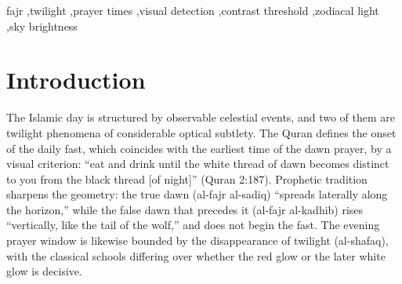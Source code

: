 \documentclass[preprint,12pt]{elsarticle}
\begin{document}
\begin{frontmatter}
\begin{abstract}
42 dates, and even the $15^{\circ}$ convention is undefined on 8. The
calibrated constant inverts consistently ($f = 51$ to 57) across the
central-mean desert campaigns it is calibrated on, with one documented
outlier (Hail, whose observed dawn is far shallower than every other
desert campaign) and no latitude trend: it behaves as a single
property of human dawn detection rather than a fit artifact. We further
compute the false dawn as a distinct earlier detection of the zodiacal
column, reproduce the qualitative suppression of its distinctness by
urban skyglow, and quantify how measured cloud fields, aerosol, and
artificial light shift the times, with propagated uncertainties reported
per event. Computed times are offered as a research instrument, not a
replacement for established calendars.
\end{abstract}

\begin{keyword}
fajr \sep twilight \sep prayer times \sep visual detection \sep contrast
threshold \sep zodiacal light \sep sky brightness
\end{keyword}

\end{frontmatter}

\section{Introduction}
\label{sec:intro}

The Islamic day is structured by observable celestial events, and two of
them are twilight phenomena of considerable optical subtlety. The Quran
defines the onset of the daily fast, which coincides with the earliest
time of the dawn prayer, by a visual criterion: ``eat and drink until the
white thread of dawn becomes distinct to you from the black thread [of
night]'' (Quran 2:187). Prophetic tradition sharpens the geometry: the
true dawn (al-fajr al-sadiq) ``spreads laterally along the horizon,''
while the false dawn that precedes it (al-fajr al-kadhib) rises
``vertically, like the tail of the wolf,'' and does not begin the fast.
The evening prayer window is likewise bounded by the disappearance of
twilight (al-shafaq), with the classical schools differing over whether
the red glow or the later white glow is decisive.
\end{document}
